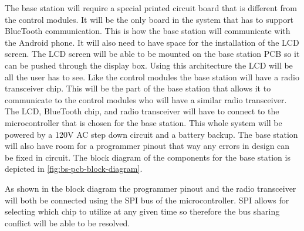 {\color{black} The base station will require a special printed circuit board
that is different from the control modules. It will be the only board in the
system that has to support BlueTooth communication. This is how the base
station will communicate with the Android phone. It will also need to have
space for the installation of the LCD screen. The LCD screen will be able to be
mounted on the base station PCB so it can be pushed through the display box.
Using this architecture the LCD will be all the user has to see. Like the
control modules the base station will have a radio transceiver chip. This will
be the part of the base station that allows it to communicate to the control
modules who will have a similar radio transceiver. The LCD, BlueTooth chip, and
radio transceiver will have to connect to the microcontroller that is chosen
for the base station. This whole system will be powered by a 120V AC step down
circuit and a battery backup. The base station will also have room for a
programmer pinout that way any errors in design can be fixed in circuit. The
block diagram of the components for the base station is depicted in
\autoref{fig:bs-pcb-block-diagram}.}


{\color{black} As shown in the block diagram the programmer pinout and the
radio transceiver will both be connected using the SPI bus of the
microcontroller. SPI allows for selecting which chip to utilize at any given
time so therefore the bus sharing conflict will be able to be resolved.}

